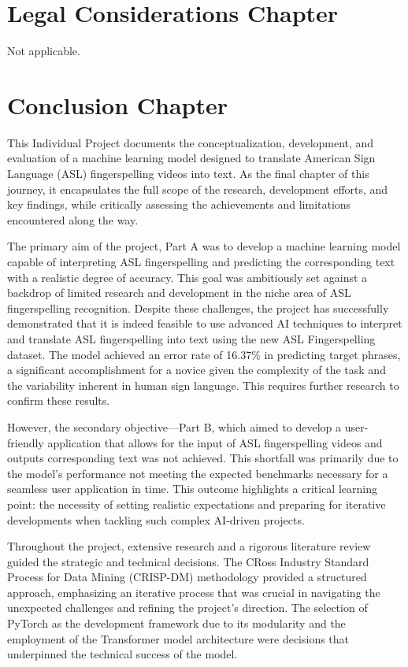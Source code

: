 \documentclass[preprint,11pt,review,authoryear]{elsarticle}
\begin{document}
\section{Legal Considerations Chapter}
Not applicable.
\section{Conclusion Chapter}

This Individual Project documents the conceptualization, development, and evaluation of a machine learning model designed to translate American Sign Language (ASL) fingerspelling videos into text. As the final chapter of this journey, it encapsulates the full scope of the research, development efforts, and key findings, while critically assessing the achievements and limitations encountered along the way.

The primary aim of the project, Part A was to develop a machine learning model capable of interpreting ASL fingerspelling and predicting the corresponding text with a realistic degree of accuracy. This goal was ambitiously set against a backdrop of limited research and development in the niche area of ASL fingerspelling recognition. Despite these challenges, the project has successfully demonstrated that it is indeed feasible to use advanced AI techniques to interpret and translate ASL fingerspelling into text using the new ASL Fingerspelling dataset. The model achieved an error rate of 16.37\% in predicting target phrases, a significant accomplishment for a novice given the complexity of the task and the variability inherent in human sign language. This requires further research to confirm these results.

However, the secondary objective—Part B, which aimed to develop a user-friendly application that allows for the input of ASL fingerspelling videos and outputs corresponding text was not achieved. This shortfall was primarily due to the model's performance not meeting the expected benchmarks necessary for a seamless user application in time. This outcome highlights a critical learning point: the necessity of setting realistic expectations and preparing for iterative developments when tackling such complex AI-driven projects.

Throughout the project, extensive research and a rigorous literature review guided the strategic and technical decisions. The CRoss Industry Standard Process for Data Mining (CRISP-DM) methodology provided a structured approach, emphasizing an iterative process that was crucial in navigating the unexpected challenges and refining the project's direction. The selection of PyTorch as the development framework due to its modularity and the employment of the Transformer model architecture were decisions that underpinned the technical success of the model.
\end{document}
